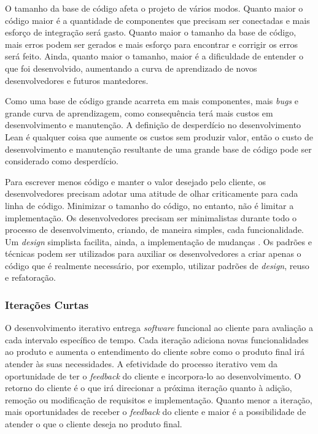 O tamanho da base de código afeta o projeto de vários modos. Quanto maior o código maior é a quantidade de componentes que precisam ser conectadas e mais esforço de integração será gasto. Quanto maior o tamanho da base de código, mais erros podem ser gerados e mais esforço para encontrar e corrigir os erros será feito. Ainda, quanto maior o tamanho, maior é a dificuldade de entender o que foi desenvolvido, aumentando a curva de aprendizado de novos desenvolvedores e futuros mantedores.  

Como uma base de código grande acarreta em mais componentes, mais \textit{bugs} e grande curva de aprendizagem, como consequência terá mais custos em desenvolvimento e manutenção. A definição de desperdício no desenvolvimento Lean é qualquer coisa que aumente os custos sem produzir valor, então o custo de desenvolvimento e manutenção resultante de uma grande base de código pode ser considerado como desperdício. 

Para escrever menos código e manter o valor desejado pelo cliente, os desenvolvedores precisam adotar uma atitude de olhar criticamente para cada linha de código. Minimizar o tamanho do código, no entanto, não é limitar a implementação. Os desenvolvedores precisam ser minimalistas durante todo o processo de desenvolvimento, criando, de maneira simples, cada funcionalidade. Um \textit{design} simplista facilita, ainda, a implementação de mudanças \cite{hibbs2009}. Os padrões e técnicas podem ser utilizados para auxiliar os desenvolvedores a criar apenas o código que é realmente necessário, por exemplo, utilizar padrões de \textit{design}, reuso e refatoração.

\subsubsection[Iterações Curtas]{Iterações Curtas}

O desenvolvimento iterativo entrega \textit{software} funcional ao cliente para avaliação a cada intervalo específico de tempo. Cada iteração adiciona novas funcionalidades ao produto e aumenta o entendimento do cliente sobre como o produto final irá atender às suas necessidades. A efetividade do processo iterativo vem da oportunidade de ter o \textit{feedback} do cliente e incorpora-lo ao desenvolvimento. O retorno do cliente é o que irá direcionar a próxima iteração quanto à adição, remoção ou modificação de requisitos e implementação. Quanto menor a iteração, mais oportunidades de receber o \textit{feedback} do cliente e maior é a possibilidade de atender o que o cliente deseja no produto final. 


